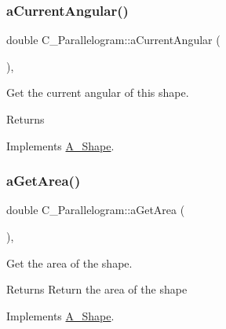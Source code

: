 \subsubsection{\texorpdfstring{a\+Current\+Angular()}{aCurrentAngular()}\hspace{0.1cm}{\footnotesize\ttfamily [2/2]}}
{\footnotesize\ttfamily double C\+\_\+\+Parallelogram\+::a\+Current\+Angular (\begin{DoxyParamCaption}{ }\end{DoxyParamCaption})\hspace{0.3cm}{\ttfamily [override]}, {\ttfamily [virtual]}}



Get the current angular of this shape. 

\begin{DoxyReturn}{Returns}

\end{DoxyReturn}


Implements \hyperlink{classA__Shape_a80fa4e009c875dd0ba7fc5bfeeb43f98}{A\+\_\+\+Shape}.

\mbox{\label{classC__Parallelogram_a72b4509a33ee27331e5b9bdc8a3278e8}} 
\subsubsection{\texorpdfstring{a\+Get\+Area()}{aGetArea()}\hspace{0.1cm}{\footnotesize\ttfamily [1/2]}}
{\footnotesize\ttfamily double C\+\_\+\+Parallelogram\+::a\+Get\+Area (\begin{DoxyParamCaption}{ }\end{DoxyParamCaption})\hspace{0.3cm}{\ttfamily [override]}, {\ttfamily [virtual]}}



Get the area of the shape. 

\begin{DoxyReturn}{Returns}
Return the area of the shape 
\end{DoxyReturn}


Implements \hyperlink{classA__Shape_a1b142ee2d873d6c217f65de1632e7b6e}{A\+\_\+\+Shape}.

\mbox{\label{classC__Parallelogram_a72b4509a33ee27331e5b9bdc8a3278e8}} 
